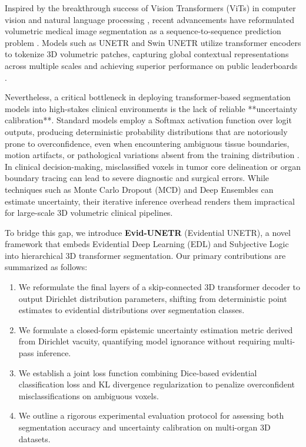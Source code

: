 \documentclass[10pt,journal,compsoc]{IEEEtran}
\begin{document}
Inspired by the breakthrough success of Vision Transformers (ViTs) in computer vision and natural language processing \cite{42,14}, recent advancements have reformulated volumetric medical image segmentation as a sequence-to-sequence prediction problem \cite{47,43}. Models such as UNETR \cite{Hatamizadeh2021UNETR} and Swin UNETR \cite{Hatamizadeh2022SwinUNETR} utilize transformer encoders to tokenize 3D volumetric patches, capturing global contextual representations across multiple scales and achieving superior performance on public leaderboards \cite{BTCV,MSD}.

Nevertheless, a critical bottleneck in deploying transformer-based segmentation models into high-stakes clinical environments is the lack of reliable **uncertainty calibration**. Standard models employ a Softmax activation function over logit outputs, producing deterministic probability distributions that are notoriously prone to overconfidence, even when encountering ambiguous tissue boundaries, motion artifacts, or pathological variations absent from the training distribution \cite{guo2017calibration}. In clinical decision-making, misclassified voxels in tumor core delineation or organ boundary tracing can lead to severe diagnostic and surgical errors. While techniques such as Monte Carlo Dropout (MCD) and Deep Ensembles can estimate uncertainty, their iterative inference overhead renders them impractical for large-scale 3D volumetric clinical pipelines.

To bridge this gap, we introduce \textbf{Evid-UNETR} (Evidential UNETR), a novel framework that embeds Evidential Deep Learning (EDL) and Subjective Logic into hierarchical 3D transformer segmentation. Our primary contributions are summarized as follows:
\begin{enumerate}
    \item We reformulate the final layers of a skip-connected 3D transformer decoder to output Dirichlet distribution parameters, shifting from deterministic point estimates to evidential distributions over segmentation classes.
    \item We formulate a closed-form epistemic uncertainty estimation metric derived from Dirichlet vacuity, quantifying model ignorance without requiring multi-pass inference.
    \item We establish a joint loss function combining Dice-based evidential classification loss and KL divergence regularization to penalize overconfident misclassifications on ambiguous voxels.
    \item We outline a rigorous experimental evaluation protocol for assessing both segmentation accuracy and uncertainty calibration on multi-organ 3D datasets.
\end{enumerate}
\end{document}
